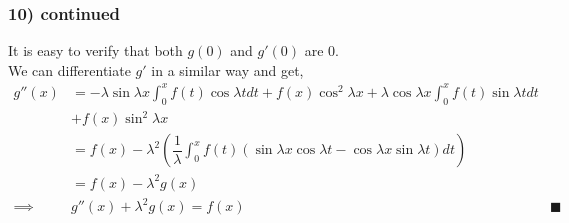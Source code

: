 \documentclass[handout]{beamer}
\begin{document}
\begin{frame}
	\frametitle{10) continued}
	It is easy to verify that both $g(0)$ and $g'(0)$ are 0.\\
	We can differentiate $g'$ in a similar way and get,
	\begin{align*}
		g''(x)   & = -\lambda\sin\lambda x\int_{0}^{x} f(t)\cos \lambda t dt + f(x)\cos^2\lambda x + \lambda \cos \lambda x \int_{0}^{x} f(t)\sin \lambda t dt                    \\
		         & + f(x)\sin^2 \lambda x                                                                                                                                         \\
		         & = f(x) - \lambda^2\left(\dfrac{1}{\lambda}\int_{0}^{x} f(t) \left(\sin \lambda x\cos \lambda t - \cos \lambda x \sin \lambda t\right) dt\right)                \\
		         & = f(x) - \lambda^2g(x)                                                                                                                                         \\
		\implies & g''(x) + \lambda^2g(x) = f(x)                                                                                                                   & \blacksquare
	\end{align*}
\end{frame}




\end{document}
